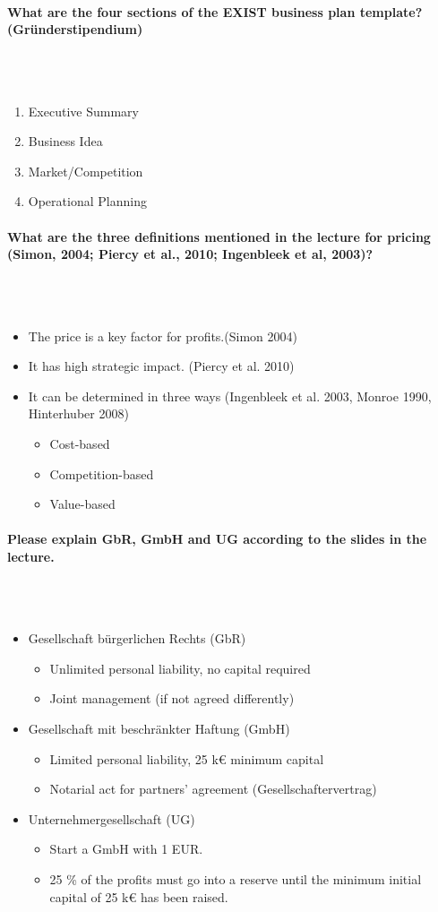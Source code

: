 \documentclass[10pt,a4paper,noendnumber=true]{scrartcl}
\newcommand{\properparagraph}[1]{\paragraph{\textcolor{Emerald}{#1}}\mbox{}\\}
\begin{document}
\properparagraph{What are the four sections of the EXIST business plan template? (Gründerstipendium)}
\\[-6ex]
\begin{enumerate}
	\item Executive Summary
	\item Business Idea
	\item Market/Competition
	\item Operational Planning
\end{enumerate}


\properparagraph{What are the three definitions mentioned in the lecture for pricing (Simon, 2004; Piercy et al., 2010; Ingenbleek et al, 2003)?}
\\[-6ex]
\begin{itemize}
	\item The price is a key factor for profits.(Simon 2004)
	\item It has high strategic impact. (Piercy et al. 2010)
	\item It can be determined in three ways
	(Ingenbleek et al. 2003, Monroe 1990, Hinterhuber 2008)
	\begin{itemize}
		\item Cost-based
		\item Competition-based
		\item Value-based
	\end{itemize}
\end{itemize}


\properparagraph{Please explain GbR, GmbH and UG according to the slides in the lecture.}
\\[-6ex]
\begin{itemize}
	\item Gesellschaft bürgerlichen Rechts (GbR)
	\begin{itemize}
		\item Unlimited personal liability, no capital required
		\item Joint management (if not agreed differently)
	\end{itemize}
	\item Gesellschaft mit beschränkter Haftung	(GmbH)
	\begin{itemize}
		\item Limited personal liability, 25 k€ minimum capital
		\item Notarial act for partners’ agreement (Gesellschaftervertrag)
	\end{itemize}
	\item Unternehmergesellschaft (UG)
	\begin{itemize}
		\item Start a  GmbH with 1 EUR.
		\item 25 \% of the profits must go into a reserve until the	minimum initial capital of 25 k€ has been raised.
	\end{itemize}
\end{itemize}
\end{document}
